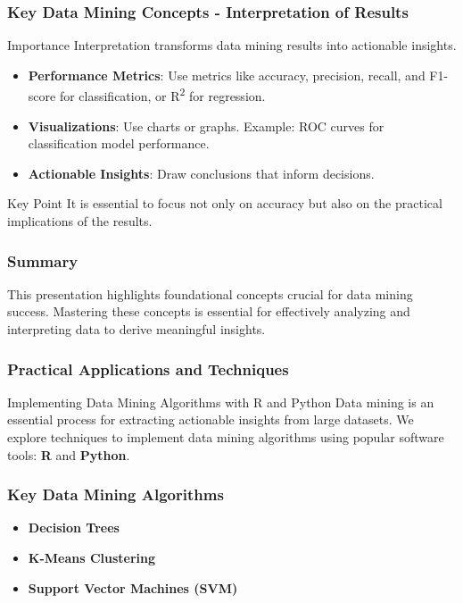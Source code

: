 \documentclass{beamer}
\begin{document}
\begin{frame}[fragile]
    \frametitle{Key Data Mining Concepts - Interpretation of Results}
    
    \begin{block}{Importance}
        Interpretation transforms data mining results into actionable insights.
    \end{block}
    
    \begin{itemize}
        \item \textbf{Performance Metrics}: Use metrics like accuracy, precision, recall, and F1-score for classification, or R\textsuperscript{2} for regression.
        \item \textbf{Visualizations}: Use charts or graphs. Example: ROC curves for classification model performance.
        \item \textbf{Actionable Insights}: Draw conclusions that inform decisions.
    \end{itemize}
    
    \begin{block}{Key Point}
        It is essential to focus not only on accuracy but also on the practical implications of the results.
    \end{block}
\end{frame}

\begin{frame}[fragile]
    \frametitle{Summary}
    This presentation highlights foundational concepts crucial for data mining success. Mastering these concepts is essential for effectively analyzing and interpreting data to derive meaningful insights.
\end{frame}

\begin{frame}
    \frametitle{Practical Applications and Techniques}
    \begin{block}{Implementing Data Mining Algorithms with R and Python}
        Data mining is an essential process for extracting actionable insights from large datasets. We explore techniques to implement data mining algorithms using popular software tools: \textbf{R} and \textbf{Python}. 
    \end{block}
\end{frame}

\begin{frame}[fragile]
    \frametitle{Key Data Mining Algorithms}
    \begin{itemize}
        \item \textbf{Decision Trees}
        \item \textbf{K-Means Clustering}
        \item \textbf{Support Vector Machines (SVM)}
    \end{itemize}
\end{frame}
\end{document}
